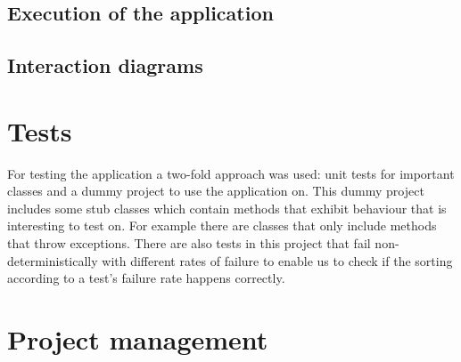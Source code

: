 \documentclass[i2]{oss}
\begin{document}
\subsection{Execution of the application}


\subsection{Interaction diagrams}
\label{ssec:Interactiedia}




\section{Tests}
\label{ssec:tests}

For testing the application a two-fold approach was used: unit tests for
important classes and a dummy project to use the application on.
This dummy project includes some stub classes which contain methods that
exhibit behaviour that is interesting to test on.
For example there are classes that only include methods that throw 
exceptions.
There are also tests in this project that fail non-deterministically with 
different rates of failure to enable us to check if the sorting according 
to a test's failure rate happens correctly.



\section{Project management}
\label{ssec:Projectmanag}

\end{document}
